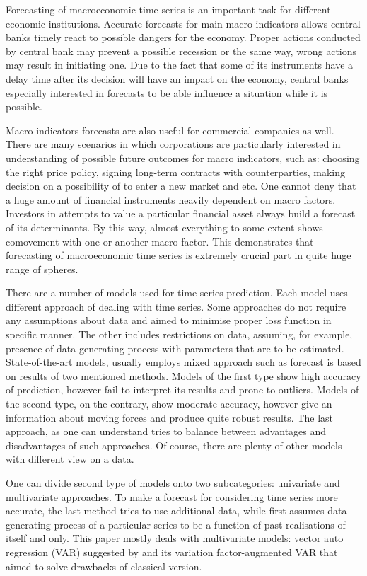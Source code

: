 \documentclass[a4paper, 14pt]{article}
\begin{document}
Forecasting of macroeconomic time series is an important task for different economic institutions. Accurate forecasts for main macro indicators allows central banks timely react to possible dangers for the economy. Proper actions conducted by central bank may prevent a possible recession or the same way, wrong actions may result in initiating one. Due to the fact that some of its instruments have a delay time after its decision will have an impact on the economy, central banks especially interested in forecasts to be able influence a situation while it is possible. 

Macro indicators forecasts are also useful for commercial companies as well. There are many scenarios in which corporations are particularly interested in understanding of possible future outcomes for macro indicators, such as: choosing the right price policy, signing long-term contracts with counterparties, making decision on a possibility of to enter a new market and etc. One cannot deny that a huge amount of financial instruments heavily dependent on macro factors. Investors in attempts to value a particular financial asset always build a forecast of its determinants. By this way, almost everything to some extent shows comovement with one or another macro factor. This demonstrates that forecasting of macroeconomic time series is extremely crucial part in quite huge range of spheres.  

There are a number of models used for time series prediction. Each model uses different approach of dealing with time series. Some approaches do not require any assumptions about data and aimed to minimise proper loss function in specific manner. The other includes restrictions on data, assuming, for example, presence of data-generating process with parameters that are to be estimated. State-of-the-art models, usually employs mixed approach such as forecast is based on results of two mentioned methods. Models of the first type show high accuracy of prediction, however fail to interpret its results and prone to outliers. Models of the second type, on the contrary, show moderate accuracy, however give an information about moving forces and produce quite robust results. The last approach, as one can understand tries to balance between advantages and disadvantages of such approaches. Of course, there are plenty of other models with different view on a data. 

One can divide second type of models onto two subcategories: univariate and multivariate approaches. To make a forecast for considering time series more accurate, the last method tries to use additional data, while first assumes data generating process of a particular series to be a function of past realisations of itself and only. This paper mostly deals with multivariate models: vector auto regression (VAR) suggested by \cite{sims1980martingale} and its variation factor-augmented VAR that aimed to solve drawbacks of classical version.  
\end{document}
